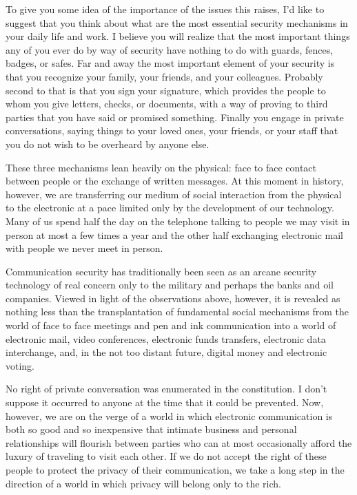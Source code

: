 \bigbreak

\para To give you some idea of the importance of the issues this
raises, I'd like to suggest that you think about what are the most
essential security mechanisms in your daily life and work.  I believe
you will realize that the most important things any of you ever do by
way of security have nothing to do with guards, fences, badges, or
safes.  Far and away the most important element of your security is
that you recognize your family, your friends, and your colleagues.
Probably second to that is that you sign your signature, which
provides the people to whom you give letters, checks, or documents,
with a way of proving to third parties that you have said or promised
something.  Finally you engage in private conversations, saying things
to your loved ones, your friends, or your staff that you do not wish
to be overheard by anyone else. \endpara

\para These three mechanisms lean heavily on the physical: face to
face contact between people or the exchange of written messages.
At this moment in history, however, we are transferring our medium
of social interaction from the physical to the electronic at a pace
limited only by the development of our technology.  Many of us spend
half the day on the telephone talking to people we may visit in person
at most a few times a year and the other half exchanging electronic
mail with people we never meet in person. \endpara

\para Communication security has traditionally been seen as an
arcane security technology of real concern only to the military and
perhaps the banks and oil companies.  Viewed in light of the
observations above, however, it is revealed as nothing less than the
transplantation of fundamental social mechanisms from the world of
face to face meetings and pen and ink communication into a world of
electronic mail, video conferences, electronic funds transfers,
electronic data interchange, and, in the not too distant future,
digital money and electronic voting. \endpara

\para No right of private conversation was enumerated in the
constitution.  I don't suppose it occurred to anyone at the time that
it could be prevented.  Now, however, we are on the verge of a world
in which electronic communication is both so good and so inexpensive
that intimate business and personal relationships will flourish
between parties who can at most occasionally afford the luxury of
traveling to visit each other.  If we do not accept the right of these
people to protect the privacy of their communication, we take a long
step in the direction of a world in which privacy will belong only
to the rich. \endpara

